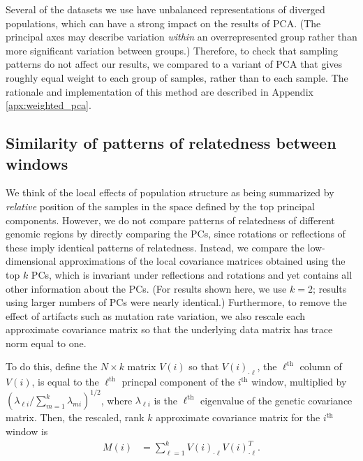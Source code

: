 \documentclass[11pt, oneside]{article}   	%
\begin{document}
Several of the datasets we use have unbalanced representations of diverged populations,
which can have a strong impact on the results of PCA.
(The principal axes may describe variation \emph{within} an overrepresented group
rather than more significant variation between groups.)
Therefore, to check that sampling patterns do not affect our results,
we compared to a variant of PCA that gives roughly equal weight to each group of samples,
rather than to each sample.
The rationale and implementation of this method are described in Appendix \ref{apx:weighted_pca}.


\subsection{Similarity of patterns of relatedness between windows}

We think of the local effects of population structure as being summarized by \emph{relative} position of the samples
in the space defined by the top principal components.
However, 
we do not compare patterns of relatedness of different genomic regions by directly comparing the PCs,
since rotations or reflections of these imply identical patterns of relatedness.
Instead, we compare the low-dimensional approximations of the local covariance matrices
obtained using the top $k$ PCs,
which is invariant under reflections and rotations and yet contains all other information about the PCs.
(For results shown here, we use $k=2$;
results using larger numbers of PCs were nearly identical.)
Furthermore, to remove the effect of artifacts such as mutation rate variation,
we also rescale each approximate covariance matrix 
so that the underlying data matrix has trace norm equal to one.

To do this, define the $N \times k$ matrix $V(i)$ so that $V(i)_{\cdot \ell}$, 
the $\ell^\text{th}$ column of $V(i)$,
is equal to the $\ell^\text{th}$ princpal component of the $i^\text{th}$ window,
multiplied by $( \lambda_{\ell i} / \sum_{m=1}^k \lambda_{m i} )^{1/2}$,
where $\lambda_{\ell i}$ is the $\ell^\text{th}$ eigenvalue of the genetic covariance matrix.
Then, the rescaled, rank $k$ approximate covariance matrix for the $i^\text{th}$ window is
\begin{align} \label{eqn:est_cov}
    M(i) &= \sum_{\ell=1}^k V(i)_{\cdot \ell} V(i)_{\cdot \ell}^T .
\end{align}
\end{document}
